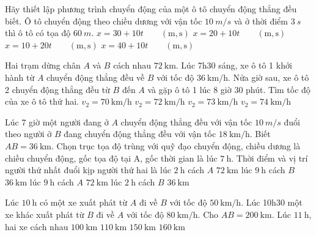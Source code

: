 \begin{ex}
Hãy thiết lập phương trình chuyển động của một ô tô chuyển động thẳng đều biết. Ô tô chuyển động theo chiều dương với vận tốc $\SI{10}{m/s}$ và ở thời điểm $\SI{3}{s}$ thì ô tô có tọa độ $\SI{60}{m}$.
		\choice
		{\True $x=30+10t\qquad\left(\si{\meter}, \si{\second}\right)$}
		{$x=20+10t\qquad\left(\si{\meter}, \si{\second}\right)$}
		{$x=10+20t\qquad\left(\si{\meter}, \si{\second}\right)$}
		{$x=40+10t\qquad\left(\si{\meter}, \si{\second}\right)$}
	\loigiai{}
\end{ex}

\begin{ex}
	Hai trạm dừng chân $A$ và $B$ cách nhau $\SI{72}{\kilo\meter}$. Lúc 7h30 sáng, xe ô tô 1 khởi hành từ $A$ chuyển động thẳng đều về $B$ với tốc độ $\SI{36}{\kilo\meter/\hour}$. Nửa giờ sau, xe ô tô 2 chuyển động thẳng đều từ $B$ đến $A$ và gặp ô tô 1 lúc 8 giờ 30 phút. Tìm tốc độ của xe ô tô thứ hai.
		\choice
		{$v_2=\SI{70}{\kilo\meter/\hour}$}
		{\True $v_2=\SI{72}{\kilo\meter/\hour}$}
		{$v_2=\SI{73}{\kilo\meter/\hour}$}
		{$v_2=\SI{74}{\kilo\meter/\hour}$}
	
	\loigiai{}
\end{ex}

\begin{ex}
	Lúc 7 giờ một người đang ở $A$ chuyển động thẳng đều với vận tốc $\SI{10}{m/s}$ đuổi theo người ở $B$ đang chuyển động thẳng đều với vận tốc $\SI{18}{\kilo\meter/\hour}$. Biết $AB =\SI{36}{\kilo\meter}$. Chọn trục tọa độ trùng với quỹ đạo chuyển động, chiều dương là chiều chuyển động, gốc tọa độ tại A, gốc thời gian là lúc $\SI{7}{\hour}$. Thời điểm và vị trí người thứ nhất đuổi kịp người thứ hai là
		\choice
		{lúc $\SI{2}{\hour}$ cách $A$ $\SI{72}{\kilo\meter}$}
		{lúc $\SI{9}{\hour}$ cách $B$ $\SI{36}{\kilo\meter}$}
		{\True lúc $\SI{9}{\hour}$ cách $A$ $\SI{72}{\kilo\meter}$}
		{lúc $\SI{2}{\hour}$ cách $B$ $\SI{36}{\kilo\meter}$}
	\loigiai{}
\end{ex}

\begin{ex}
	Lúc $\SI{10}{\hour}$ có một xe xuất phát từ $A$ đi về $B$ với tốc độ $\SI{50}{\kilo\meter/\hour}$. Lúc 10h30 một xe khác xuất phát từ $B$ đi về $A$ với tốc độ $\SI{80}{\kilo\meter/\hour}$. Cho $AB =\SI{200}{\kilo\meter}$. Lúc $\SI{11}{\hour}$, hai xe cách nhau
		\choice
		{$\SI{100}{\kilo\meter}$}
		{\True $\SI{110}{\kilo\meter}$}
		{$\SI{150}{\kilo\meter}$}
		{$\SI{160}{\kilo\meter}$}
	
	\loigiai{}
\end{ex}

